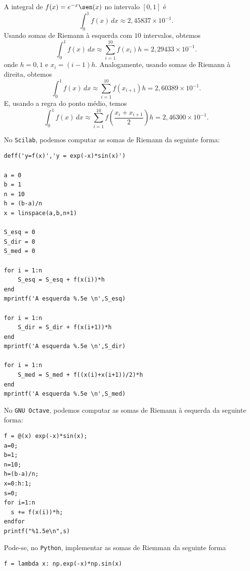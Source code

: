\begin{ex}
  A integral de $f(x) = e^{-x}\sen(x)$ no intervalo $[0,1]$ é
  \begin{equation}
    \int_{0}^{1} f(x)\,dx \approx 2,45837\times 10^{-1}.
  \end{equation}
Usando somas de Riemann à esquerda com $10$ intervalos, obtemos
\begin{equation}
  \int_0^1 f(x)\,dx \approx \sum_{i=1}^{10} f(x_{i})h = 2,29433\times 10^{-1}.
\end{equation}
onde $h=0,1$ e $x_i=(i-1)h$. Analogamente, usando somas de Riemann à direita, obtemos
\begin{equation}
  \int_0^1 f(x)\,dx \approx \sum_{i=1}^{10} f(x_{i+1})h = 2,60389\times 10^{-1}.
\end{equation}
E, usando a regra do ponto médio, temos
\begin{equation}
  \int_0^1 f(x)\,dx \approx \sum_{i=1}^{10} f\left(\frac{x_i+x_{i+1}}{2}\right)h = 2,46300\times 10^{-1}.
\end{equation}

\ifisscilab
No \verb+Scilab+, podemos computar as somas de Riemann da seguinte forma:
\begin{verbatim}
deff('y=f(x)','y = exp(-x)*sin(x)')

a = 0
b = 1
n = 10
h = (b-a)/n
x = linspace(a,b,n+1) 

S_esq = 0
S_dir = 0
S_med = 0

for i = 1:n
    S_esq = S_esq + f(x(i))*h
end
mprintf('A esquerda %.5e \n',S_esq)

for i = 1:n
    S_dir = S_dir + f(x(i+1))*h
end
mprintf('A esquerda %.5e \n',S_dir)

for i = 1:n
    S_med = S_med + f((x(i)+x(i+1))/2)*h
end
mprintf('A esquerda %.5e \n',S_med)
\end{verbatim}
\fi
\ifisoctave
No \verb+GNU Octave+, podemos computar as somas de Riemann à esquerda da seguinte forma:
\begin{verbatim}
f = @(x) exp(-x)*sin(x);
a=0;
b=1;
n=10;
h=(b-a)/n;
x=0:h:1;
s=0;
for i=1:n
  s += f(x(i))*h;
endfor
printf("%1.5e\n",s)
\end{verbatim}
\fi
\ifispython
Pode-se, no \verb+Python+, implementar as somas de Riemman da seguinte forma
\begin{verbatim}
f = lambda x: np.exp(-x)*np.sin(x)


\end{verbatim}
\end{ex}
